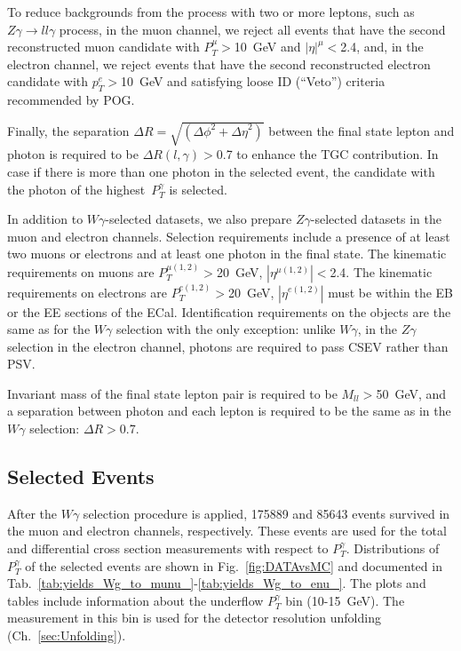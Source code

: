 To reduce backgrounds from the process with two or more leptons, such as $Z\gamma\rightarrow l l \gamma$ process, in the muon channel, we reject all events that have the second reconstructed muon candidate with $P_T^{\mu}>$10~GeV and $|\eta|^{\mu}<$2.4, and, in the electron channel, we reject events that have the second reconstructed electron candidate with $p_T^e>$10~GeV and satisfying loose ID (``Veto'') criteria recommended by POG.

Finally, the separation $\Delta R=\sqrt{({\Delta\phi}^2+{\Delta\eta}^2)}$ between the final state lepton and photon is required to be $\Delta R(l,\gamma)>$0.7 to enhance the TGC contribution. In case if there is more than one photon in the selected event, the candidate with the photon of the highest~$P_T^{\gamma}$ is selected. 

In addition to $W\gamma$-selected datasets, we also prepare $Z\gamma$-selected datasets in the muon and electron channels. Selection requirements include a presence of at least two muons or electrons and at least one photon in the final state. The kinematic requirements on muons are $P_T^{\mu(1,2)}>$20~GeV, $|\eta^{\mu(1,2)}|<$2.4. The kinematic requirements on electrons are $P_T^{e(1,2)}>$20~GeV, $|\eta^{e(1,2)}|$ must be within the EB or the EE sections of the ECal. Identification requirements on the objects are the same as for the $W\gamma$ selection with the only exception: unlike $W\gamma$, in the $Z\gamma$ selection in the electron channel, photons are required to pass CSEV rather than PSV. 

Invariant mass of the final state lepton pair is required to be $M_{ll}>$50~GeV, and a separation between photon and each lepton is required to be the same as in the $W\gamma$ selection: $\Delta R>$0.7. 

\subsection{Selected Events}

After the $W\gamma$ selection procedure is applied, 175889 and 85643 events survived in the muon and electron channels, respectively. These events are used for the total and differential cross section measurements with respect to $P_T^{\gamma}$. Distributions of $P_T^{\gamma}$ of the selected events are shown in Fig.~\ref{fig:DATAvsMC} and documented in Tab.~\ref{tab:yields_Wg_to_munu_}-\ref{tab:yields_Wg_to_enu_}. The plots and tables include information about the underflow $P_T^{\gamma}$ bin (10-15~GeV). The measurement in this bin is used for the detector resolution unfolding (Ch.~\ref{sec:Unfolding}). 

